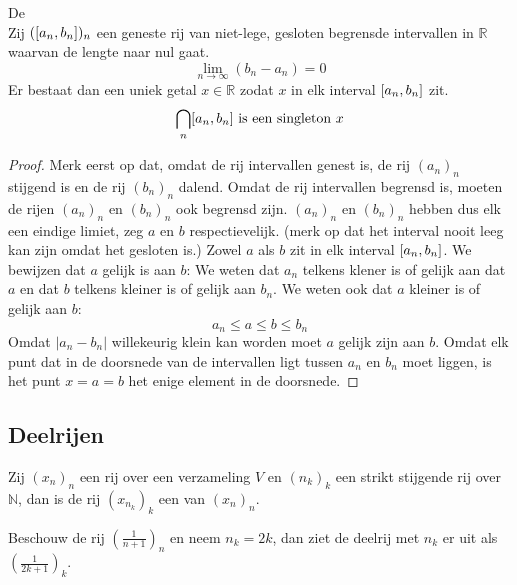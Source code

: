 \documentclass[main.tex]{subfiles}
\begin{document}
\begin{st}
  \label{st:geneste-intervallen}
  De \\
  Zij $(\interval{a_{n}}{b_{n}})_{n}$ een geneste rij van niet-lege, gesloten begrensde intervallen in $\mathbb{R}$ waarvan de lengte naar nul gaat.
  \[ \lim_{n \rightarrow \infty}(b_{n}-a_{n}) = 0 \]
  Er bestaat dan een uniek getal $x\in \mathbb{R}$ zodat $x$ in elk interval $\interval{a_{n}}{b_{n}}$ zit.
  \[ \bigcap_{n}\interval{a_{n}}{b_{n}} \text{ is een singleton } x \]

  \begin{proof}
    Merk eerst op dat, omdat de rij intervallen genest is, de rij $(a_{n})_{n}$ stijgend is en de rij $(b_{n})_{n}$ dalend.
    Omdat de rij intervallen begrensd is, moeten de rijen $(a_{n})_{n}$ en $(b_{n})_{n}$ ook begrensd zijn.
    $(a_{n})_{n}$ en $(b_{n})_{n}$ hebben dus elk een eindige limiet, zeg $a$ en $b$ respectievelijk.
    (merk op dat het interval nooit leeg kan zijn omdat het gesloten is.)
    Zowel $a$ als $b$ zit in elk interval $\interval{a_{n}}{b_{n}}$.
    We bewijzen dat $a$ gelijk is aan $b$:
    We weten dat $a_{n}$ telkens klener is of gelijk aan dat $a$ en dat $b$ telkens kleiner is of gelijk aan $b_{n}$.
    We weten ook dat $a$ kleiner is of gelijk aan $b$:
    \[ a_{n} \le a \le b \le b_{n} \]
    Omdat $|a_{n}-b_{n}|$ willekeurig klein kan worden moet $a$ gelijk zijn aan $b$.
    Omdat elk punt dat in de doorsnede van de intervallen ligt tussen $a_{n}$ en $b_{n}$ moet liggen, is het punt $x=a=b$ het enige element in de doorsnede.
  \end{proof}
\end{st}


\subsection{Deelrijen}
\label{sec:deelrijen}

\begin{de}
  Zij $(x_{n})_{n}$ een rij over een verzameling $V$ en $(n_{k})_{k}$ een strikt stijgende rij over $\mathbb{N}$, dan is de rij $(x_{n_{k}})_{k}$ een  van $(x_{n})_{n}$.
\end{de}

\begin{vb}
  Beschouw de rij $\left(\frac{1}{n+1}\right)_{n}$ en neem $n_{k} = 2k$, dan ziet de deelrij met $n_{k}$ er uit als $\left( \frac{1}{2k+1} \right)_{k}$.
\end{vb}
\end{document}
